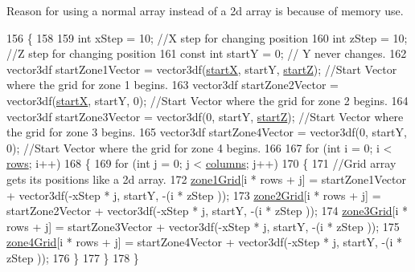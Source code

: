  Reason for using a normal array instead of a 2d array is because of memory use. 
\begin{DoxyCode}
156 \{
158 
159     \textcolor{keywordtype}{int} xStep = 10; \textcolor{comment}{//X step for changing position}
160     \textcolor{keywordtype}{int} zStep = 10; \textcolor{comment}{//Z step for changing position}
161     \textcolor{keyword}{const} \textcolor{keywordtype}{int} startY = 0; \textcolor{comment}{// Y never changes.}
162     vector3df startZone1Vector = vector3df(\hyperlink{class_object_placement_generation_a265fa21c083b78b5c98410436ff33d72}{startX}, startY, \hyperlink{class_object_placement_generation_aa0632a6f68c075e03d6a8c6551f53e4c}{startZ}); \textcolor{comment}{//Start Vector where the
       grid for zone 1 begins.}
163     vector3df startZone2Vector = vector3df(\hyperlink{class_object_placement_generation_a265fa21c083b78b5c98410436ff33d72}{startX}, startY, 0); \textcolor{comment}{//Start Vector where the grid for zone
       2 begins.}
164     vector3df startZone3Vector = vector3df(0, startY, \hyperlink{class_object_placement_generation_aa0632a6f68c075e03d6a8c6551f53e4c}{startZ}); \textcolor{comment}{//Start Vector where the grid for zone
       3 begins.}
165     vector3df startZone4Vector = vector3df(0, startY, 0); \textcolor{comment}{//Start Vector where the grid for zone 4 begins.}
166 
167     \textcolor{keywordflow}{for} (\textcolor{keywordtype}{int} i = 0; i < \hyperlink{class_object_placement_generation_a9de1ce3954d2a5aff10af4e88bb26516}{rows}; i++)
168     \{
169         \textcolor{keywordflow}{for} (\textcolor{keywordtype}{int} j = 0; j < \hyperlink{class_object_placement_generation_a872cbf261b7aac7c6f9c570b56d92acd}{columns}; j++)
170         \{
171             \textcolor{comment}{//Grid array gets its positions like a 2d array.}
172             \hyperlink{class_object_placement_generation_aad1c9c2a56afd002bb8b551232292d65}{zone1Grid}[i * rows + j] = startZone1Vector + vector3df(-xStep * j, startY, -(i * zStep
      ));
173             \hyperlink{class_object_placement_generation_a2dbfd8e1e0b6dc2e25c0dd8207f473c7}{zone2Grid}[i * rows + j] = startZone2Vector + vector3df(-xStep * j, startY, -(i * zStep
      ));
174             \hyperlink{class_object_placement_generation_ad315e69d1bbacdfc0c3dfabcc02511b0}{zone3Grid}[i * rows + j] = startZone3Vector + vector3df(-xStep * j, startY, -(i * zStep
      ));
175             \hyperlink{class_object_placement_generation_a1422711f765890659a9fb0250a8e693c}{zone4Grid}[i * rows + j] = startZone4Vector + vector3df(-xStep * j, startY, -(i * zStep
      ));
176         \}
177     \}
178 \}
\end{DoxyCode}
